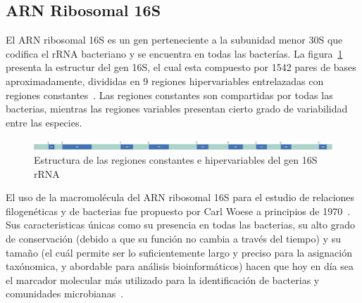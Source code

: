 \subsection{ARN Ribosomal 16S}
El ARN ribosomal 16S es un gen perteneciente a la subunidad menor 30S que codifica el rRNA bacteriano y se encuentra en todas las bacterías. 
La figura~\ref{fig:16S_structure} presenta la estructur del gen 16S, el cual esta compuesto por 1542 pares de bases aproximadamente, divididas en 9 regiones hipervariables entrelazadas con regiones constantes~\cite{clarridge2004impact}.
Las regiones constantes son compartidas por todas las bacterias, mientras las regiones variables presentan cierto grado de variabilidad entre las especies. 



\begin{figure}[H]
    \centering
    \includegraphics[width=1\linewidth]{images/16s_diagram-2.pdf}
    \caption{Estructura de las regiones constantes e hipervariables del gen 16S rRNA}
    \label{fig:16S_structure}
\end{figure}


El uso de la macromolécula del ARN ribosomal  16S para el estudio de relaciones filogenéticas y de bacterias fue propuesto por Carl Woese a principios de 1970~\cite{olsen1993ribosomal}.
Sus caracteristicas únicas como su presencia en todas las bacterias, su alto grado de conservación (debido a que su función no cambia a través del tiempo) y su tamaño (el cuál permite ser lo suficientemente largo y preciso para la asignación taxónomica, y abordable para análisis bioinformáticos) hacen que hoy en día sea el marcador molecular más utilizado para la identificación de bacterias y comunidades microbianas~\cite{reller2007detection,janda200716s,lopez2023determining,patel200116s}.


